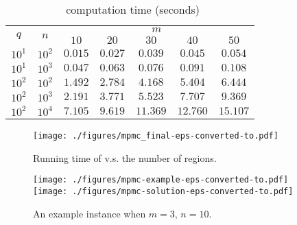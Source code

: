 \begin{table}[ht!]
    \vspace*{-2mm}
    \footnotesize
    \centering
    \begin{tabular}{|c|c|c|c|c|c|c|} 
        \hline
        \multirow{2}{*}{$q$} & \multirow{2}{*}{$n$} & \multicolumn{5}{|c|}{$m$} \\ \cline{3-7}
        \rule{0pt}{2.5ex} & & $10$ & $20$ & $30$ & $40$ & $50$ \\ \hline
        \rule{0pt}{2.5ex} $10^1$ & $10^2$ & $ 0.015$ & $ 0.027$ & $ 0.039$ & $ 0.045$ & $ 0.054$ \\ \hline
        \rule{0pt}{2.5ex} $10^1$ & $10^3$ & $ 0.047$ & $ 0.063$ & $ 0.076$ & $ 0.091$ & $ 0.108$ \\ \hline
        \rule{0pt}{2.5ex} $10^2$ & $10^2$ & $ 1.492$ & $ 2.784$ & $ 4.168$ & $ 5.404$ & $ 6.444$ \\ \hline
        \rule{0pt}{2.5ex} $10^2$ & $10^3$ & $ 2.191$ & $ 3.771$ & $ 5.523$ & $ 7.707$ & $ 9.369$ \\ \hline
        \rule{0pt}{2.5ex} $10^2$ & $10^4$ & $ 7.105$ & $ 9.619$ & $11.369$ & $12.760$ & $15.107$ \\ \hline
    \end{tabular}
    \vspace*{-2mm}
    \caption{\label{eval:opg-mpmc:2} \algoMRG~computation time (seconds)}
    \vspace*{-4mm}
\end{table}

\begin{figure}[ht!]
    \centering
    \texttt{[image: ./figures/mpmc\_final-eps-converted-to.pdf]}
    \vspace*{-2mm}
    \caption{\label{fig:opg-mpmc:m}Running time of \algoMRG 
		v.s. the number of regions.}
    \vspace*{-2mm}
\end{figure}

\begin{figure}[ht!]
    \centering
    \texttt{[image: ./figures/mpmc-example-eps-converted-to.pdf]}
    \texttt{[image: ./figures/mpmc-solution-eps-converted-to.pdf]}
    \vspace*{-3mm}
    \caption{\label{fig:opg-mpmc-ex} An example instance when $m = 3$, $n = 10$.} 
    \vspace*{-4mm}
\end{figure}

